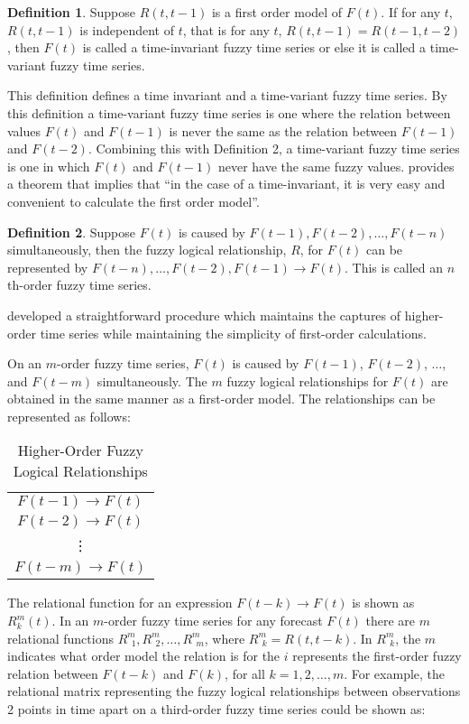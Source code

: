 \documentclass{article}
\theoremstyle{definition}
\newtheorem{ftsdef}{Definition}
\begin{document}
\begin{ftsdef}
\label{def4}
Suppose $R(t,t-1)$ is a first order model of $F(t)$. If for any $t$, $R(t,t-1)$ is independent of $t$, that is for any $t$, $R(t,t-1) = R(t-1,t-2)$, then $F(t)$ is called a time-invariant fuzzy time series or else it is called a time-variant fuzzy time series.
\end{ftsdef}

This definition defines a time invariant and a time-variant fuzzy time series. By this definition a time-variant fuzzy time series is one where the relation between values $F(t)$ and $F(t-1)$ is never the same as the relation between $F(t-1)$ and $F(t-2)$. Combining this with Definition 2, a time-variant fuzzy time series is one in which $F(t)$ and $F(t-1)$ never have the same fuzzy values. \cite{song1993forecasting} provides a theorem that implies that ``in the case of a time-invariant, it is very easy and convenient to calculate the first order model''.


\begin{ftsdef}
\label{def5}
Suppose $F(t)$ is caused by $F(t-1),F(t-2),\ldots,F(t-n)$ simultaneously, then the fuzzy logical relationship, $R$, for $F(t)$ can be represented by $F(t-n),\ldots, F(t-2),F(t-1) \rightarrow F(t)$. This is called an $n$th-order fuzzy time series.
\end{ftsdef}

\cite{tsai1999study} developed a straightforward procedure which maintains the captures of higher-order time series while maintaining the simplicity of first-order calculations.

On an $m$-order fuzzy time series, $F(t)$ is caused by $F(t-1)$, $F(t-2)$, $\ldots$, and $F(t-m)$ simultaneously. The $m$ fuzzy logical relationships for $F(t)$ are obtained in the same manner as a first-order model. The relationships can be represented as follows:

\begin{table}[H]
	\center
	\begin{tabular}{ c }
  	$F(t-1) \rightarrow F(t)$ \\
  	$F(t-2) \rightarrow F(t)$ \\
  	\vdots \\
  	$F(t-m) \rightarrow F(t)$ \\
	\end{tabular}
	\caption{Higher-Order Fuzzy Logical Relationships}
\end{table}

The relational function for an expression $F(t-k) \rightarrow F(t)$ is shown as $R^{m}_{k}(t)$. In an $m$-order fuzzy time series for any forecast $F(t)$ there are $m$ relational functions $R^{m}_{\ \ 1}, R^{m}_{\ \ 2}, \ldots, R^{m}_{\ \ m}$, where $R^{m}_{\ \ k}=R(t,t-k)$. In $R^{m}_{\ \ k}$, the $m$ indicates what order model the relation is for the $i$ represents the first-order fuzzy relation between $F(t-k)$ and $F(k)$, for all $k={1,2,\ldots,m}$. For example, the relational matrix representing the fuzzy logical relationships between observations 2 points in time apart on a third-order fuzzy time series could be shown as:
\end{document}
